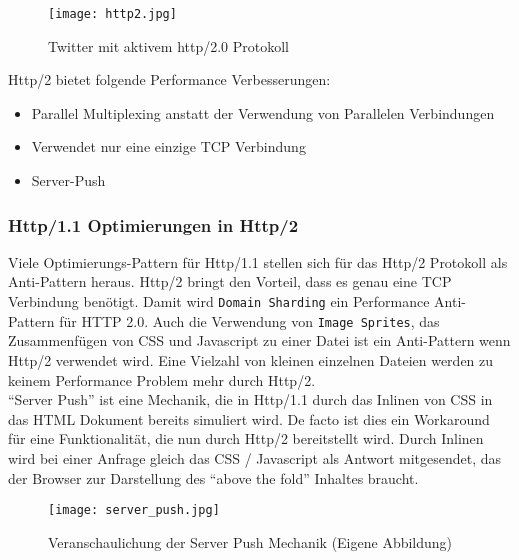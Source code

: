 		\begin{figure}[htbp]
			\begin{center}
				\texttt{[image: http2.jpg]}
				\caption{Twitter mit aktivem http/2.0 Protokoll}
				\label{fig:http2}
			\end{center}
		\end{figure}

		Http/2 bietet folgende Performance Verbesserungen:

		\begin{itemize}
			\item Parallel Multiplexing anstatt der Verwendung von Parallelen Verbindungen
			\item Verwendet nur eine einzige TCP Verbindung
			\item Server-Push
		\end{itemize}
		
		\subsubsection{Http/1.1 Optimierungen in Http/2} %
		\label{ssub:http_1_1_optimierungen_in_http_2}
			Viele Optimierungs-Pattern für Http/1.1 stellen sich für das Http/2 Protokoll als Anti-Pattern heraus. Http/2 bringt den Vorteil, dass es genau eine TCP Verbindung benötigt. Damit wird \texttt{Domain Sharding} ein Performance Anti-Pattern für HTTP 2.0. Auch die Verwendung von \texttt{Image Sprites}, das Zusammenfügen von CSS und Javascript zu einer Datei ist ein Anti-Pattern wenn Http/2 verwendet wird. Eine Vielzahl von kleinen einzelnen Dateien werden zu keinem Performance Problem mehr durch Http/2.\autocite{grigorikHttp2}\\
			"`Server Push"' ist eine Mechanik, die in Http/1.1 durch das Inlinen von CSS in das HTML Dokument bereits simuliert wird. De facto ist dies ein Workaround für eine Funktionalität, die nun durch Http/2 bereitstellt wird. Durch Inlinen wird bei einer Anfrage gleich das CSS / Javascript als Antwort mitgesendet, das der Browser zur Darstellung des "`above the fold"' Inhaltes braucht.

			\begin{figure}[htbp]
				\begin{center}
					\texttt{[image: server\_push.jpg]}
					\caption{Veranschaulichung der Server Push Mechanik (Eigene Abbildung)}
					\label{fig:server_push}
				\end{center}
			\end{figure}
			
